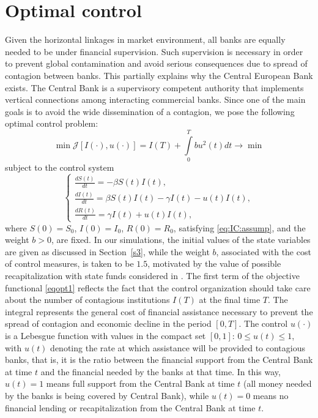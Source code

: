 \documentclass[a4paper,10pt,twoside]{article}
\begin{document}

\section{Optimal control}
\label{s4}

Given the horizontal linkages in market environment, all banks are equally needed 
to be under financial supervision. Such supervision is necessary in order to prevent 
global contamination and avoid serious consequences due to spread of contagion 
between banks. This partially explains why the Central European Bank exists. 
The Central Bank is a supervisory competent authority that implements vertical 
connections among interacting commercial banks. Since one of the main goals 
is to avoid the wide dissemination of a contagion, we pose
the following optimal control problem:
\begin{equation}
\label{eqopt1}
\min \mathcal{J}[I(\cdot),u(\cdot)]
=I(T)+\int\limits_0^T b u^2(t) dt \longrightarrow \min
\end{equation}
subject to the control system
\begin{equation}
\label{eqopt2}
\begin{cases}
\displaystyle \frac{dS(t)}{dt} = - \beta S(t) I(t),\\[0.3cm]
\displaystyle \frac{dI(t)}{dt} = \beta S(t) I(t) - \gamma I(t)-u(t)I(t),\\[0.3cm]
\displaystyle \frac{dR(t)}{dt} = \gamma I(t)+u(t)I(t),
\end{cases}
\end{equation}
where $S(0) = S_0$, $I(0) = I_0$, $R(0) = R_0$,
satisfying \eqref{eq:IC:assump}, and the weight $b > 0$, are fixed.
In our simulations, the initial values of the state variables 
are given as discussed in Section~\ref{s3}, 
while the weight $b$, associated with the cost of control measures, 
is taken to be $1.5$, motivated by the value of possible recapitalization 
with state funds considered in \cite{[24]}. 
The first term of the objective functional \eqref{eqopt1} reflects 
the fact that the control organization should take care about the 
number of contagious institutions $I(T)$ at the final time $T$. 
The integral represents the general cost of financial assistance necessary 
to prevent the spread of contagion and economic decline in the period $[0, T]$. 
The control $u(\cdot)$ is a Lebesgue function with values in the compact set 
$[0, 1]$: $0 \leq u(t) \leq 1$, with $u(t)$ denoting the rate at which assistance 
will be provided to contagious banks, that is, it is the ratio between the financial 
support from the Central Bank at time $t$ and the financial needed by the banks at that time. 
In this way, $u(t) = 1$ means full support from the Central Bank at time $t$
(all money needed by the banks is being covered by Central Bank), while $u(t) = 0$ 
means no financial lending or recapitalization from the Central Bank at time $t$.
\end{document}
